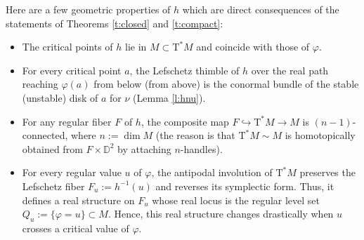 \documentclass[10pt]{amsart}
\newcommand{\D}{{\mathbb D}}
\newcommand{\sT}{\mathrm{T}^\ast}
\newcommand{\de}{\mathrel{:=}}
\let\into\hookrightarrow
\theoremstyle{plain}
\theoremstyle{definition}
\begin{document}
Here are a few geometric properties of $h$ which are direct consequences of the
statements of Theorems \ref{t:closed} and \ref{t:compact}:
\begin{itemize}
\item
The critical points of $h$ lie in $M \subset \sT M$ and coincide with those of
$\varphi$.
\item
For every critical point $a$, the Lefschetz thimble of $h$ over the real path
reaching $\varphi(a)$ from below (\resp from above) is the conormal bundle of
the stable (\resp unstable) disk of $a$ for $\nu$ (\cf Lemma \ref{l:hnu}).
\item
For any regular fiber $F$ of $h$, the composite map $F \into \sT M \to M$ is
$(n-1)$-connected, where $n \de \dim M$ (the reason is that $\sT M \sim M$ is
homotopically obtained from $F \times \D^2$ by attaching $n$-handles).
\item
For every regular value $u$ of $\varphi$, the antipodal involution of $\sT M$
preserves the Lefschetz fiber $F_u \de h^{-1}(u)$ and reverses its symplectic
form. Thus, it defines a real structure on $F_u$ whose real locus is the regular
level set $Q_u \de \{\varphi=u\} \subset M$. Hence, this real structure changes
drastically when $u$ crosses a critical value of $\varphi$.
\end{itemize}
\end{document}
